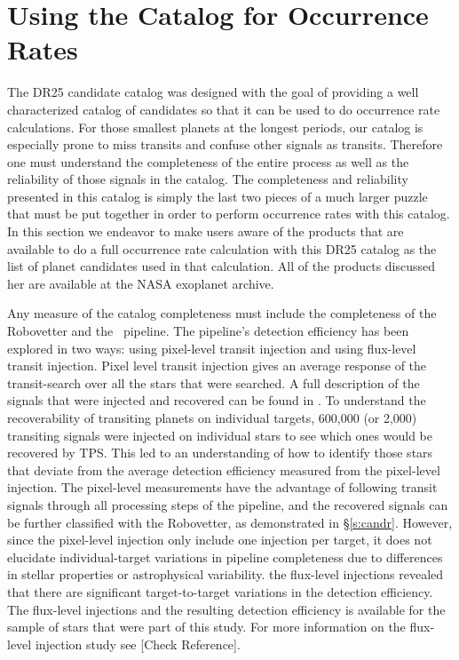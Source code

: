 \section{Using the Catalog for Occurrence Rates}
\label{s:occurates}
The DR25 candidate catalog was designed with the goal of providing a well characterized catalog of candidates so that it can be used to do occurrence rate calculations.  For those smallest planets at the longest periods, our catalog is especially prone to miss transits and confuse other signals as transits.  Therefore one must understand the completeness of the entire process as well as the reliability of those signals in the catalog.  The completeness and reliability presented in this catalog is simply the last two pieces of a much larger puzzle that must be put together in order to perform occurrence rates with this catalog.  In this section we endeavor to make users aware of the products that are available to do a full occurrence rate calculation with this DR25 catalog as the list of planet candidates used in that calculation. All of the products discussed her are available at the NASA exoplanet archive. 

Any measure of the catalog completeness must include the completeness of the Robovetter and the \Kepler\ pipeline.  The pipeline's detection efficiency has been explored in two ways: using pixel-level transit injection and using flux-level transit injection.  Pixel level transit injection gives an average response of the transit-search over all the stars that were searched. A full description of the signals that were injected and recovered can be found in \citet{Christiansen2017}.  To understand the recoverability of transiting planets on individual targets, 600,000 (or 2,000) transiting signals were injected on individual stars to see which ones would be recovered by TPS.  This led to an understanding of how to identify those stars that deviate from the average detection efficiency measured from the pixel-level injection.  The pixel-level measurements have the advantage of following transit signals through all processing steps of the \Kepler{} pipeline, and the recovered signals can be further classified with the Robovetter, as demonstrated in \S\ref{s:candr}.  However, since the pixel-level injection only include one injection per target, it does not elucidate individual-target variations in pipeline completeness due to differences in stellar properties or astrophysical variability. the flux-level injections revealed  that  there  are  significant target-to-target variations in the detection efficiency. The flux-level injections and the resulting detection efficiency is available for the sample of stars that were part of this study. For more information on the flux-level injection study see \citet{Burke2017c}[Check Reference]. 


